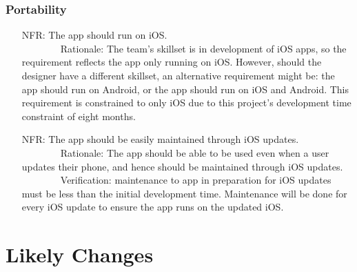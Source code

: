 \documentclass[12pt]{article}
\newcounter{nfrnum} %
\begin{document}
\subsubsection{Portability}
\begin{itemize}
\setlength{\itemindent}{.5in}
\item[NFR\refstepcounter{nfrnum}\thenfrnum\label{NFR22}:] The app should run on iOS.
\\ \-\ \-\ \-\ \-\ \-\ \-\ \-\ \-\ Rationale: The team's skillset is in development of iOS apps, so the requirement reflects the app only running on iOS. However, should the designer have a different skillset, an alternative requirement might be: the app should run on Android, or the app should run on iOS and Android. This requirement is constrained to only iOS due to this project's development time constraint of eight months.
\item[NFR\refstepcounter{nfrnum}\thenfrnum\label{NFR23}:] The app should be easily maintained through iOS updates.
\\ \-\ \-\ \-\ \-\ \-\ \-\ \-\ \-\ Rationale: The app should be able to be used even when a user updates their phone, and hence should be maintained through iOS updates.
\\ \-\ \-\ \-\ \-\ \-\ \-\ \-\ \-\ Verification: maintenance to app in preparation for iOS updates must be less than the initial development time. Maintenance will be done for every iOS update to ensure the app runs on the updated iOS.


\end{itemize}




\section{Likely Changes}    
\end{document}
